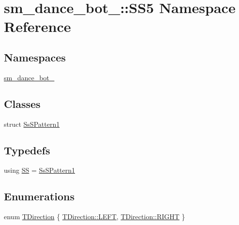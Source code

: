 \hypertarget{namespacesm__dance__bot__3_1_1SS5}{}\section{sm\+\_\+dance\+\_\+bot\+\_\+:\+:S\+S5 Namespace Reference}
\label{namespacesm__dance__bot__3_1_1SS5}
\subsection*{Namespaces}
\begin{DoxyCompactItemize}
\item 
 \hyperlink{namespacesm__dance__bot__3_1_1SS5_1_1sm__dance__bot__3}{sm\+\_\+dance\+\_\+bot\+\_}
\end{DoxyCompactItemize}
\subsection*{Classes}
\begin{DoxyCompactItemize}
\item 
struct \hyperlink{structsm__dance__bot__3_1_1SS5_1_1SsSPattern1}{Ss\+S\+Pattern1}
\end{DoxyCompactItemize}
\subsection*{Typedefs}
\begin{DoxyCompactItemize}
\item 
using \hyperlink{namespacesm__dance__bot__3_1_1SS5_a1c1758a66e275bc4c0b82d1818908682}{SS} = \hyperlink{structsm__dance__bot__3_1_1SS5_1_1SsSPattern1}{Ss\+S\+Pattern1}
\end{DoxyCompactItemize}
\subsection*{Enumerations}
\begin{DoxyCompactItemize}
\item 
enum \hyperlink{namespacesm__dance__bot__3_1_1SS5_afb36760ee122ff90c189fc415cc8daa5}{T\+Direction} \{ \hyperlink{namespacesm__dance__bot__3_1_1SS5_afb36760ee122ff90c189fc415cc8daa5a684d325a7303f52e64011467ff5c5758}{T\+Direction\+::\+L\+E\+FT}, 
\hyperlink{namespacesm__dance__bot__3_1_1SS5_afb36760ee122ff90c189fc415cc8daa5a21507b40c80068eda19865706fdc2403}{T\+Direction\+::\+R\+I\+G\+HT}
 \}
\end{DoxyCompactItemize}


